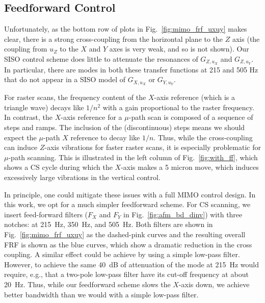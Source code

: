 \documentclass[journal]{IEEEtran}
\begin{document}

\subsection{Feedforward Control}\label{sec:ff_control}
Unfortunately, as the bottom row of plots in
Fig.~\ref{fig:mimo_frf_uxuy} makes clear, there is a strong
cross-coupling from the horizontal plane to the $Z$ axis (the coupling
from $u_Z$ to the $X$ and $Y$ axes is very weak, and so is not shown).
Our SISO control scheme does little to attenuate the resonances of
$G_{Z,u_X}$ and $G_{Z,u_Y}$. In particular, there are modes in both
these transfer functions at 215 and 505 Hz that do not appear in a
SISO model of $G_{X,u_X}$ or $G_{Y,u_Y}$.

For raster scans, the frequency content of the $X$-axis reference
(which is a triangle wave) decays like $1/n^2$ with a gain
proportional to the raster frequency. In contrast, the $X$-axis
reference for a $\mu$-path scan is composed of a sequence of steps and
ramps. The inclusion of the (discontinuous) steps means we should
expect the $\mu$-path $X$ reference to decay like $1/n$. Thus, while
the cross-coupling can induce $Z$-axis vibrations for faster raster
scans, it is especially problematic for $\mu$-path scanning. This is
illustrated in the left column of Fig.~\ref{fig:with_ff}, which shows
a CS cycle during which the $X$-axis makes a 5 micron move, which
induces excessively large vibrations in the vertical control.

In principle, one could mitigate these issues with a full MIMO control
design. In this work, we opt for a much simpler feedforward scheme.
For CS scanning, we insert feed-forward filters ($F_X$ and $F_Y$ in
Fig.~\ref{fig:afm_bd_dinv}) with three notches: at 215~Hz, 350~Hz, and
505~Hz. Both filters are shown in Fig.~\ref{fig:mimo_frf_uxuy} as the
dashed-pink curves and the
resulting overall FRF is shown as the
blue curves, which show a
dramatic reduction in the cross coupling. A similar effect could be
achieve by using a simple low-pass filter. However, to achieve the
same 40~dB of attenuation of the mode at 215~Hz would require, e.g.,
that a two-pole low-pass filter have its cut-off frequency at about
20~Hz. Thus, while our feedforward scheme slows the $X$-axis down, we
achieve better bandwidth than we would with a simple low-pass filter.
\end{document}
